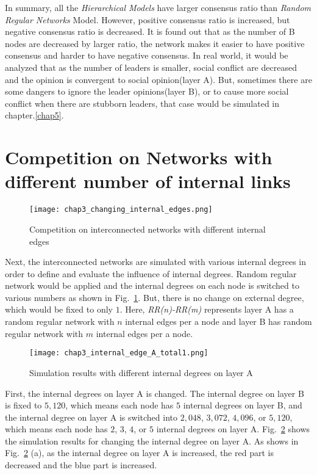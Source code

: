 In summary, all the \textit{Hierarchical Models} have larger consensus ratio than \textit{Random Regular Networks} Model. However, positive consensus ratio is increased, but negative consensus ratio is decreased. It is found out that as the number of B nodes are decreased by larger ratio, the network makes it easier to have positive consensus and harder to have negative consensus. In real world, it would be analyzed that as the number of leaders is smaller, social conflict are decreased and the opinion is convergent to social opinion(layer A). But, sometimes there are some dangers to ignore the leader opinions(layer B), or to cause more social conflict when there are stubborn leaders, that case would be simulated in chapter.\ref{chap5}. \\

\section{Competition on Networks with different number of internal links}
\begin{figure}[!htb]
	\centering
	\texttt{[image: chap3\_changing\_internal\_edges.png]}
	\caption{Competition on interconnected networks with different internal edges}
	\label{chap3_changing_internal_edges}
\end{figure}
Next, the interconnected networks are simulated with various internal degrees in order to define and evaluate the influence of internal degrees. Random regular network would be applied and the internal degrees on each node is switched to various numbers as shown in Fig.~\ref{chap3_changing_internal_edges}. But, there is no change on external degree, which would be fixed to only $1$. Here, \textit{RR(n)-RR(m)} represents layer A has a random regular network with $n$ internal edges per a node and layer B has random regular network with $m$ internal edges per a node.

\begin{figure}[!htb]
	\centering
	\texttt{[image: chap3\_internal\_edge\_A\_total1.png]}
	\caption{Simulation results with different internal degrees on layer A}
	\label{chap3_internal_edge_A_total}
\end{figure}

First, the internal degrees on layer A is changed. The internal degree on layer B is fixed to $5,120$, which means each node has $5$ internal degrees on layer B, and the internal degree on layer A is switched into $2,048$, $3,072$, $4,096$, or $5,120$, which means each node has $2$, $3$, $4$, or $5$ internal degrees on layer A. Fig.~\ref{chap3_internal_edge_A_total} shows the simulation results for changing the internal degree on layer A. As shows in Fig.~\ref{chap3_internal_edge_A_total} (a), as the internal degree on layer A is increased, the red part is decreased and the blue part is increased.  

